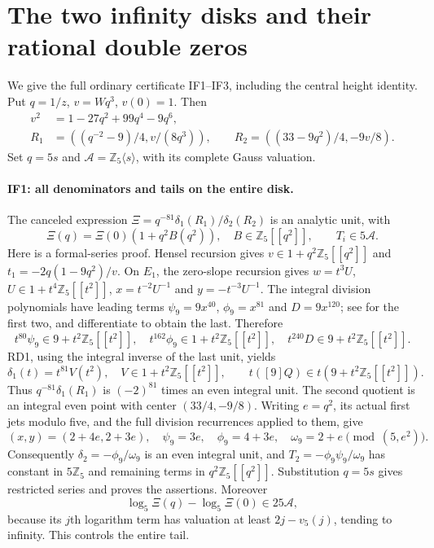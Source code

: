\section{The two infinity disks and their rational double zeros}
\label{sec-fixed-infinity-certificate}

We give the full ordinary certificate IF1--IF3, including the central
height identity. Put $q=1/z$, $v=Wq^3$, $v(0)=1$. Then
\[
\begin{split}
 v^2&=1-27q^2+99q^4-9q^6,\\
 R_1&=((q^{-2}-9)/4,v/(8q^3)),\qquad
 R_2=((33-9q^2)/4,-9v/8).
\end{split}
\]
Set $q=5s$ and $\mathcal A=\mathbb Z_5\langle s\rangle$, with its
complete Gauss valuation.

\paragraph{IF1: all denominators and tails on the entire disk.}
The canceled expression
$\Xi=q^{-81}\delta_1(R_1)/\delta_2(R_2)$ is an analytic unit, with
\[
 \Xi(q)=\Xi(0)(1+q^2 B(q^2)),\quad B\in\mathbb Z_5[[q^2]],\qquad
 T_i\in5\mathcal A.
\]
Here is a formal-series proof. Hensel recursion gives
$v\in1+q^2\mathbb Z_5[[q^2]]$ and
$t_1=-2q(1-9q^2)/v$. On $E_1$, the zero-slope recursion gives
$w=t^3U$, $U\in1+t^4\mathbb Z_5[[t^2]]$,
$x=t^{-2}U^{-1}$ and $y=-t^{-3}U^{-1}$.
The integral division polynomials have leading terms
$\psi_9=9x^{40}$, $\phi_9=x^{81}$ and $D=9x^{120}$;
see \cite[Lemma 5.22]{SutherlandDivisionPolynomials2023} for the first two,
and differentiate to obtain the last. Therefore
\[
 t^{80}\psi_9\in9+t^2\mathbb Z_5[[t^2]],\quad
 t^{162}\phi_9\in1+t^2\mathbb Z_5[[t^2]],\quad
 t^{240}D\in9+t^2\mathbb Z_5[[t^2]].
\]
RD1, using the integral inverse of the last unit, yields
\[
 \delta_1(t)=t^{81}V(t^2),\quad V\in1+t^2\mathbb Z_5[[t^2]],\qquad
 t([9]Q)\in t(9+t^2\mathbb Z_5[[t^2]]).
\]
Thus $q^{-81}\delta_1(R_1)$ is $(-2)^{81}$ times an even integral unit.
The second quotient is an integral even point with center $(33/4,-9/8)$.
Writing $e=q^2$, its actual first jets modulo five, and the full
division recurrences applied to them, give
\[
 (x,y)=(2+4e,2+3e),\quad
 \psi_9=3e,\quad \phi_9=4+3e,\quad \omega_9=2+e\pmod{(5,e^2)}.
\]
Consequently $\delta_2=-\phi_9/\omega_9$ is an even integral unit,
and $T_2=-\phi_9\psi_9/\omega_9$ has constant in $5\mathbb Z_5$
and remaining terms in $q^2\mathbb Z_5[[q^2]]$. Substitution $q=5s$
gives restricted series and proves the assertions. Moreover
\[
 \log_5\Xi(q)-\log_5\Xi(0)\in25\mathcal A,
\]
because its $j$th logarithm term has valuation at least
$2j-v_5(j)$, tending to infinity. This controls the entire tail.

